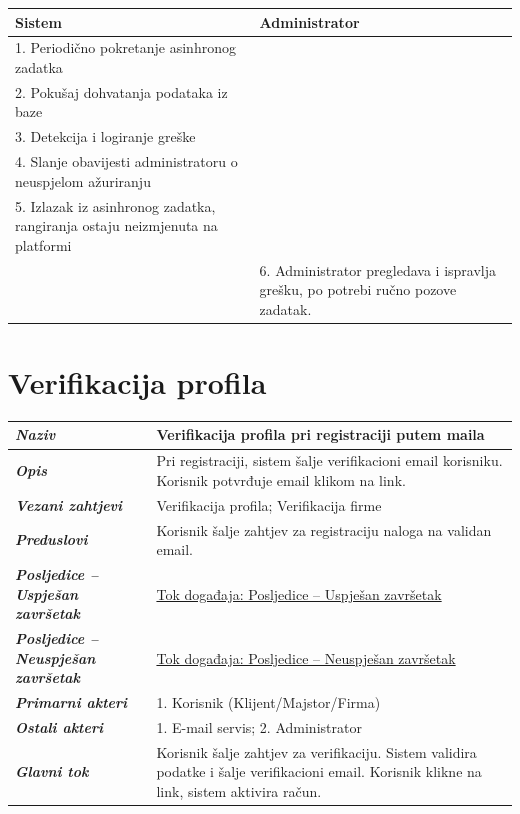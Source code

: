 \documentclass[12pt,a4paper]{article}
\newcommand{\usecase}[9]{%
\begin{longtable}{|L{4cm}|L{11cm}|}
\hline
\textbf{\textit{Naziv}} & \textbf{#1} \\
\hline
\textbf{\textit{Opis}} & #2 \\
\hline
\textbf{\textit{Vezani zahtjevi}} & #3 \\
\hline
\textbf{\textit{Preduslovi}} & #4 \\
\hline
\textbf{\textit{Posljedice -- Uspješan završetak}} & #5 \\
\hline
\textbf{\textit{Posljedice -- Neuspješan završetak}} & #6 \\
\hline
\textbf{\textit{Primarni akteri}} & #7 \\
\hline
\textbf{\textit{Ostali akteri}} & #8 \\
\hline
\textbf{\textit{Glavni tok}} & #9 \\
\hline
\end{longtable}%
}
\begin{document}
\begin{longtable}{|L{7.5cm}|L{7.5cm}|}
    \hline
    \textbf{Sistem}                                                              & \textbf{Administrator}                                                           \\
    . Periodično pokretanje asinhronog zadatka                                  &                                                                                  \\
    . Pokušaj dohvatanja podataka iz baze                                       &                                                                                  \\
    . Detekcija i logiranje greške                                              &                                                                                  \\
    . Slanje obavijesti administratoru o neuspjelom ažuriranju                  &                                                                                  \\
    . Izlazak iz asinhronog zadatka, rangiranja ostaju neizmjenuta na platformi &                                                                                  \\
    \hline
                                                                                 & 6. Administrator pregledava i ispravlja grešku, po potrebi ručno pozove zadatak. \\
    \hline
\end{longtable}




\section{Verifikacija profila}

\usecase
{Verifikacija profila pri registraciji putem maila}
{Pri registraciji, sistem šalje verifikacioni email korisniku. Korisnik potvrđuje email klikom na link. }
{Verifikacija profila; Verifikacija firme}
{Korisnik šalje zahtjev za registraciju naloga na validan email.}
{\hyperref[tok:5.1] {Tok događaja: Posljedice -- Uspješan završetak}}
{\hyperref[tok:5.2]{ Tok događaja: Posljedice -- Neuspješan završetak}}
{1. Korisnik (Klijent/Majstor/Firma)}
{1. E-mail servis; 2. Administrator}
{Korisnik šalje zahtjev za verifikaciju. Sistem validira podatke i šalje verifikacioni email. Korisnik klikne na link, sistem aktivira račun. }
\end{document}
